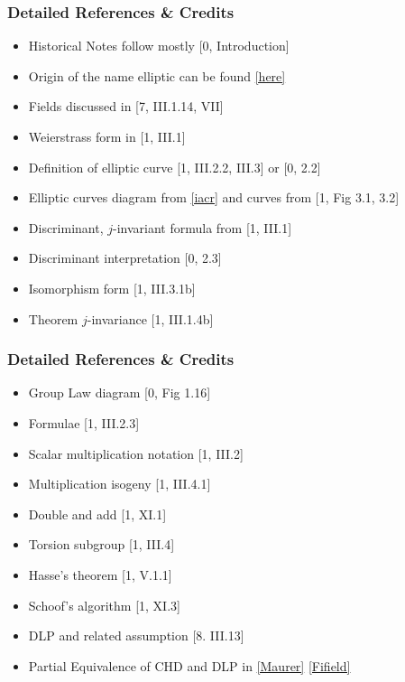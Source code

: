 \documentclass{beamer}
\begin{document}
\begin{frame}[noframenumbering]
   \frametitle{Detailed References \& Credits}
   \begin{itemize}
       \item Historical Notes follow mostly [0, Introduction]
       \item Origin of the name elliptic can be found \href{https://www.unf.edu/~ddreibel/mas4932/elliptic-integrals.pdf}{[here]}
       \item Fields discussed in [7, III.1.14, VII]
       \item Weierstrass form in [1, III.1] 
       \item Definition of elliptic curve [1, III.2.2, III.3] or  [0, 2.2]
       \item Elliptic curves diagram from \href{https://www.iacr.org/authors/tikz/}{[iacr]} and curves from [1, Fig 3.1, 3.2]
       \item Discriminant, $j$-invariant formula from [1, III.1]
       \item Discriminant interpretation [0, 2.3]
       \item Isomorphism form [1, III.3.1b]
       \item Theorem $j$-invariance [1, III.1.4b]
       
   \end{itemize}
\end{frame}

\begin{frame}[noframenumbering]
    \frametitle{Detailed References \& Credits}
   \begin{itemize}
       \item Group Law diagram [0, Fig 1.16]
       \item Formulae [1, III.2.3]
       \item Scalar multiplication notation [1, III.2]
       \item Multiplication isogeny [1, III.4.1]
       \item Double and add [1, XI.1]
       \item Torsion subgroup [1, III.4]
       \item Hasse's theorem [1, V.1.1]
       \item Schoof's algorithm [1, XI.3]
       \item DLP and related assumption [8. III.13]
       \item Partial Equivalence of CHD and DLP in \href{https://crypto.ethz.ch/publications/Maurer94.html}{[Maurer]} \href{https://citeseerx.ist.psu.edu/viewdoc/download?doi=10.1.1.232.8069&rep=rep1&type=pdf}{[Fifield]}
       
   \end{itemize}
\end{frame}
\end{document}
